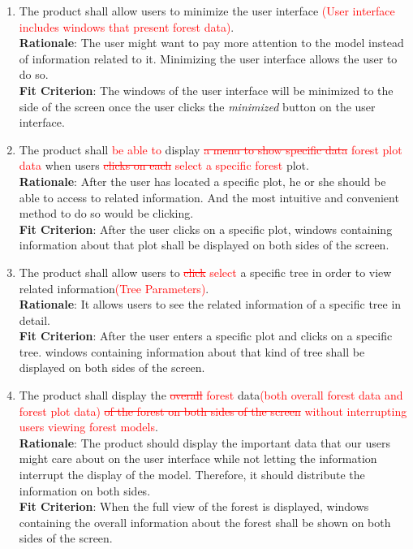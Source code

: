 \documentclass{article}
\begin{document}
\begin{enumerate}[FR1]
    \item The product shall allow users to minimize the user interface\textcolor{red}{ (User 
    interface includes windows that present forest data)}. \\
    \textbf{Rationale}: The user might want to pay more attention to the model instead of information related to it. Minimizing the user interface allows the user to do so. \\
	\textbf{Fit Criterion}: The windows of the user interface will be minimized to the side of the screen once the user clicks the \textit{minimized} button on the user interface.
	
	\item The product shall \textcolor{red}{be able to} display \textcolor{red}{\st{a menu to show
	 specific data} forest plot data} when users \textcolor{red}{\st{clicks on each} select
	 a specific forest} plot.\\
	\textbf{Rationale}: After the user has located a specific plot, he or she should be able to access to related information. And the most intuitive and convenient method to do so would be clicking. \\
	\textbf{Fit Criterion}: After the user clicks on a specific plot, windows containing information about that plot shall be displayed on both sides of the screen.
	
	\item The product shall allow users to \textcolor{red}{\st{click} select} a specific tree in order
	 to view related information\textcolor{red}{(Tree Parameters)}.\\
	\textbf{Rationale}: It allows users to see the related information of a specific tree in detail.\\
	\textbf{Fit Criterion}: After the user enters a specific plot and clicks on a specific tree. windows containing information about that kind of tree shall be displayed on both sides of the screen. 
	
	\item The product shall display the \textcolor{red}{\st{overall} forest} data\textcolor{red}{(both 
	overall forest data and forest plot data)} \textcolor{red}{\st{of the forest on both sides of the
	 screen} without interrupting users viewing forest models}.\\
	\textbf{Rationale}: The product should display the important data that our users might care about on the user interface while not letting the information interrupt the display of the model. Therefore, it should distribute the information on both sides.\\
	\textbf{Fit Criterion}: When the full view of the forest is displayed, windows containing the overall information about the forest shall be shown on both sides of the screen. 
	

\end{enumerate}
\end{document}
